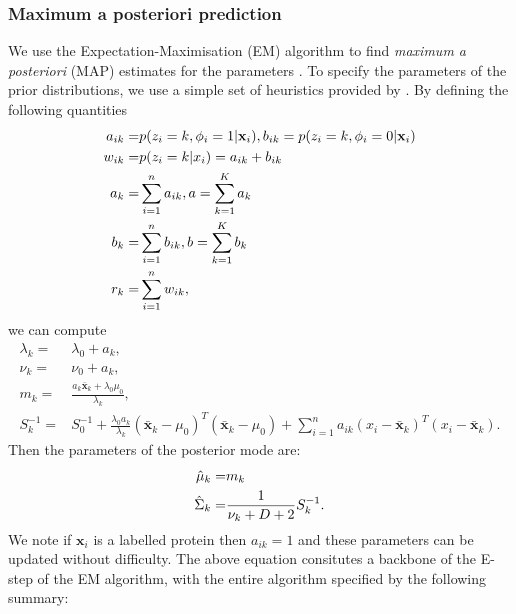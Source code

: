 \documentclass[12pt,english]{article}
\begin{document}
\subsubsection{Maximum a posteriori prediction}
We use the Expectation-Maximisation (EM) algorithm \citep{EM:1977} to find {\em maximum a posteriori} (MAP) estimates for the parameters \cite[see, for example,][]{Murphy:2012}. To specify the parameters of the prior distributions, we use a simple set of heuristics provided
by \cite{Fraley:2007}. By defining the following quantities
\begin{equation}\label{equation::estepfinal}
\begin{split}
a_{ik} = & p(z_i = k, \phi_i = 1|{\bf x}_i), b_{ik} = p(z_i = k, \phi_i = 0|{\bf x}_i) \\
w_{ik} = & p(z_i = k|x_i) = a_{ik} + b_{ik}\\
a_k = & \sum_{i=1}^{n}a_{ik}, a = \sum_{k=1}^{K}a_k \\
b_k = & \sum_{i=1}^{n}b_{ik}, b = \sum_{k=1}^{K}b_k \\
r_k = & \sum_{i=1}^{n}w_{ik},
\end{split}
\end{equation}
we can compute
\begin{equation}\label{equation::Posterior}
\begin{split}
\lambda_k = &\lambda_0 + a_k, \\
\nu_k = & \nu_0 + a_k, \\
m_k = & \frac{a_k\bar{\boldsymbol{x}}_k + \lambda_0\mu_0}{\lambda_k},\\
S_k^{-1}  = & S_0^{-1} + \frac{\lambda_0 a_k}{\lambda_k}(\bar{\boldsymbol{x}}_k - \mu_0)^{T} (\bar{\boldsymbol{x}}_k - \mu_0) + \sum_{i=1}^{n} a_{ik}(x_i -\bar{\boldsymbol{x}}_k)^{T}(x_i -\bar{\boldsymbol{x}}_k).
\end{split}
\end{equation}
Then the parameters of the posterior mode are:
\begin{equation}\label{equation::MAP}
\begin{split}
\hat{{\bf\mu}}_k = &m_k \\
\hat{\Sigma}_k = &\frac{1}{\nu_k + D + 2}S_k^{-1}.
\end{split}
\end{equation}
We note if $\boldsymbol{x}_i$ is a labelled protein then $a_{ik} = 1$ and these parameters can be updated without difficulty.
The above equation consitutes a backbone of the E-step of the EM algorithm, with the entire algorithm specified by the following summary:
\end{document}
